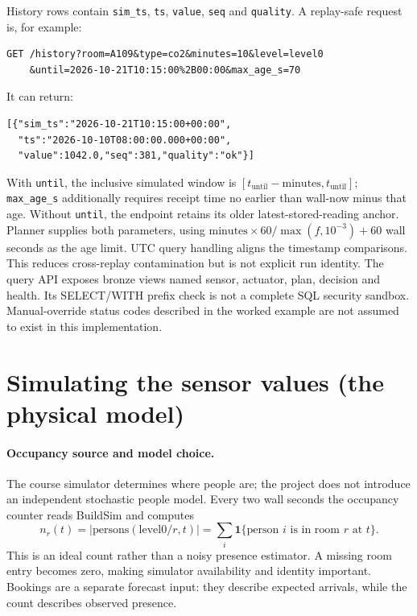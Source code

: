 \documentclass[11pt,a4paper]{article}
\begin{document}
History rows contain \texttt{sim\_ts}, \texttt{ts}, \texttt{value}, \texttt{seq} and \texttt{quality}. A replay-safe request is, for example:
{\small\begin{verbatim}
GET /history?room=A109&type=co2&minutes=10&level=level0
    &until=2026-10-21T10:15:00%2B00:00&max_age_s=70
\end{verbatim}}
It can return:
{\small\begin{verbatim}
[{"sim_ts":"2026-10-21T10:15:00+00:00",
  "ts":"2026-10-10T08:00:00.000+00:00",
  "value":1042.0,"seq":381,"quality":"ok"}]
\end{verbatim}}
With \texttt{until}, the inclusive simulated window is $[t_{\mathrm{until}}-\mathrm{minutes},t_{\mathrm{until}}]$; \texttt{max\_age\_s} additionally requires receipt time no earlier than wall-now minus that age. Without \texttt{until}, the endpoint retains its older latest-stored-reading anchor. Planner supplies both parameters, using $\mathrm{minutes}\times60/\max(f,10^{-3})+60$ wall seconds as the age limit. UTC query handling aligns the timestamp comparisons. This reduces cross-replay contamination but is not explicit run identity. The query API exposes bronze views named sensor, actuator, plan, decision and health. Its SELECT/WITH prefix check is not a complete SQL security sandbox. Manual-override status codes described in the worked example are not assumed to exist in this implementation.

\section{Simulating the sensor values (the physical model)}
\paragraph{Occupancy source and model choice.}
The course simulator determines where people are; the project does not introduce an independent stochastic people model. Every two wall seconds the occupancy counter reads BuildSim and computes
\begin{equation}
n_r(t)=|\mathrm{persons}(\mathrm{level0}/r,t)|
=\sum_i\mathbf1\{\text{person }i\text{ is in room }r\text{ at }t\}.
\end{equation}
This is an ideal count rather than a noisy presence estimator. A missing room entry becomes zero, making simulator availability and identity important. Bookings are a separate forecast input: they describe expected arrivals, while the count describes observed presence.
\end{document}
